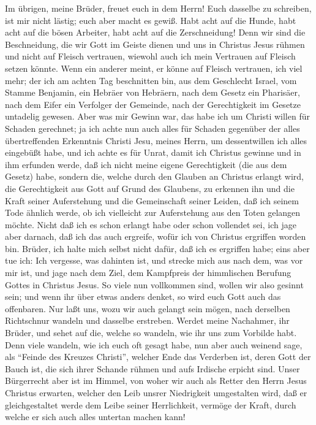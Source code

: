  Im übrigen, meine Brüder, freuet euch in dem Herrn! Euch
dasselbe zu schreiben, ist mir nicht lästig; euch aber macht es gewiß.
 Habt acht auf die Hunde, habt acht auf die bösen
Arbeiter, habt acht auf die Zerschneidung!  Denn wir sind
die Beschneidung, die wir Gott im Geiste dienen und uns in Christus
Jesus rühmen und nicht auf Fleisch vertrauen,  wiewohl
auch ich mein Vertrauen auf Fleisch setzen könnte. Wenn ein anderer
meint, er könne auf Fleisch vertrauen, ich viel mehr;  der
ich am achten Tag beschnitten bin, aus dem Geschlecht Israel, vom Stamme
Benjamin, ein Hebräer von Hebräern, nach dem Gesetz ein Pharisäer,
 nach dem Eifer ein Verfolger der Gemeinde, nach der
Gerechtigkeit im Gesetze untadelig gewesen.  Aber was mir
Gewinn war, das habe ich um Christi willen für Schaden gerechnet;
 ja ich achte nun auch alles für Schaden gegenüber der
alles übertreffenden Erkenntnis Christi Jesu, meines Herrn, um
dessentwillen ich alles eingebüßt habe, und ich achte es für Unrat,
damit ich Christus gewinne  und in ihm erfunden werde, daß
ich nicht meine eigene Gerechtigkeit (die aus dem Gesetz) habe, sondern
die, welche durch den Glauben an Christus erlangt wird, die
Gerechtigkeit aus Gott auf Grund des Glaubens,  zu
erkennen ihn und die Kraft seiner Auferstehung und die Gemeinschaft
seiner Leiden, daß ich seinem Tode ähnlich werde,  ob ich
vielleicht zur Auferstehung aus den Toten gelangen möchte.
 Nicht daß ich es schon erlangt habe oder schon vollendet
sei, ich jage aber darnach, daß ich das auch ergreife, wofür ich von
Christus ergriffen worden bin.  Brüder, ich halte mich
selbst nicht dafür, daß ich es ergriffen habe;  eins aber
tue ich: Ich vergesse, was dahinten ist, und strecke mich aus nach dem,
was vor mir ist, und jage nach dem Ziel, dem Kampfpreis der himmlischen
Berufung Gottes in Christus Jesus.  So viele nun
vollkommen sind, wollen wir also gesinnt sein; und wenn ihr über etwas
anders denket, so wird euch Gott auch das offenbaren. 
Nur laßt uns, wozu wir auch gelangt sein mögen, nach derselben
Richtschnur wandeln und dasselbe erstreben.  Werdet meine
Nachahmer, ihr Brüder, und sehet auf die, welche so wandeln, wie ihr uns
zum Vorbilde habt.  Denn viele wandeln, wie ich euch oft
gesagt habe, nun aber auch weinend sage, als ``Feinde des Kreuzes
Christi'',  welcher Ende das Verderben ist, deren Gott
der Bauch ist, die sich ihrer Schande rühmen und aufs Irdische erpicht
sind.  Unser Bürgerrecht aber ist im Himmel, von woher
wir auch als Retter den Herrn Jesus Christus erwarten, 
welcher den Leib unsrer Niedrigkeit umgestalten wird, daß er
gleichgestaltet werde dem Leibe seiner Herrlichkeit, vermöge der Kraft,
durch welche er sich auch alles untertan machen kann!

